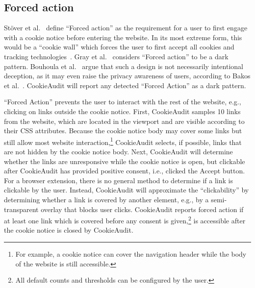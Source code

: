 \subsection{Forced action}
Stöver et al.~\cite{stover2022website} define \enquote{Forced action} as the requirement for a user to first engage with a cookie notice before entering the website.
In its most extreme form, this would be a \enquote{cookie wall} which forces the user to first accept all cookies and tracking technologies~\cite{bouhoula2023automated}.
Gray et al.~\cite{gray2021dark} considers \enquote{Forced action} to be a dark pattern.
Bouhoula et al.~\cite{bouhoula2023automated} argue that such a design is not necessarily intentional deception, as it may even raise the privacy awareness of users, according to Bakos et al.~\cite{bakos2014fineprint}.
CookieAudit will report any detected \enquote{Forced Action} as a dark pattern.

\enquote{Forced Action} prevents the user to interact with the rest of the website, e.g., clicking on links outside the cookie notice.
First, CookieAudit samples 10 links from the website, which are located in the viewport and are visible according to their CSS attributes.
Because the cookie notice body may cover some links but still allow most website interaction,\footnote{
For example, a cookie notice can cover the navigation header while the body of the website is still accessible.
} CookieAudit selects, if possible, links that are not hidden by the cookie notice body.
Next, CookieAudit will determine whether the links are unresponsive while the cookie notice is open, but clickable after CookieAudit has provided positive consent, i.e., clicked the \textsf{Accept} button.
For a browser extension, there is no general method to determine if a link is clickable by the user. 
Instead, CookieAudit will approximate the \enquote{clickability} by determining whether a link is covered by another element, e.g., by a semi-transparent overlay that blocks user clicks.
CookieAudit reports forced action if at least one link which is covered before any consent is given,\footnote{All default counts and thresholds can be configured by the user.}
is accessible after the cookie notice is closed by CookieAudit.

